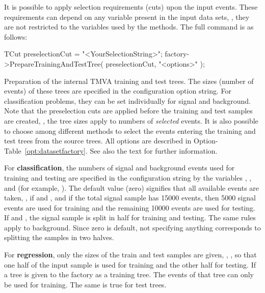 It is possible to apply selection requirements (cuts) upon the input
events. These requirements can depend on any variable present in the
input data sets, \ie, they are not restricted to the variables used by
the methods. The full command is as follows:
\begin{codeexample}
\begin{tmvacode}
TCut preselectionCut = "<YourSelectionString>";
factory->PrepareTrainingAndTestTree( preselectionCut, "<options>" );
\end{tmvacode}
\caption[.]{\codeexampleCaptionSize Preparation of the internal TMVA
  training and test trees. The sizes (number of events) of these trees
  are specified in the configuration option string. For classification
  problems, they can be set individually for signal and
  background. Note that the preselection cuts are applied before the
  training and test samples are created, \ie, the tree sizes apply to
  numbers of {\em selected} events. It is also possible to choose
  among different methods to select the events entering the training
  and test trees from the source trees. All options are described in
  Option-Table~\ref{opt:datasetfactory}. See also the text for further
  information.}
\label{ce:treePreparation}
\end{codeexample}
For {\bf classification}, the numbers of signal and background events
used for training and testing are specified in the configuration
string by the variables ,
,  and
 (for example,
).
The default value (zero) signifies that all available events are
taken, \eg, if  and ,
and if the total signal sample has 15000 events, then 5000 signal
events are used for training and the remaining 10000 events are used
for testing. If  and , the
signal sample is split in half for training and testing.  The same
rules apply to background. Since zero is default, not specifying
anything corresponds to splitting the samples in two halves.

For {\bf regression}, only the sizes of the train and test samples are given, \eg,
, so that one half of the input 
sample is used for training and the other half for testing. If a tree is 
given to the factory as a training tree. The events of that tree can only be used for training. The same is true for test trees. 

